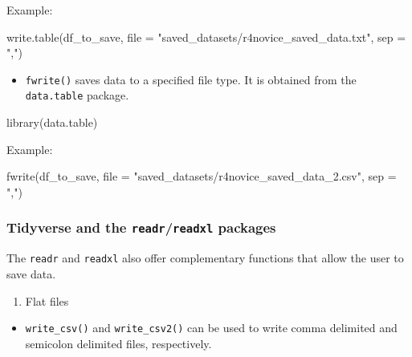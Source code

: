 \documentclass[
  letterpaper,
  DIV=11,
  numbers=noendperiod]{scrreprt}
\newenvironment{Shaded}{}{}
\newcommand{\AttributeTok}[1]{\textcolor[rgb]{0.84,0.23,0.29}{#1}}
\newcommand{\FunctionTok}[1]{\textcolor[rgb]{0.44,0.26,0.76}{#1}}
\newcommand{\NormalTok}[1]{\textcolor[rgb]{0.14,0.16,0.18}{#1}}
\newcommand{\StringTok}[1]{\textcolor[rgb]{0.01,0.18,0.38}{#1}}
\providecommand{\tightlist}{%
  \setlength{\itemsep}{0pt}\setlength{\parskip}{0pt}}\usepackage{longtable,booktabs,array}
\begin{document}
Example:

\begin{Shaded}
\begin{Highlighting}[]
\FunctionTok{write.table}\NormalTok{(df\_to\_save, }\AttributeTok{file =} \StringTok{"saved\_datasets/r4novice\_saved\_data.txt"}\NormalTok{, }\AttributeTok{sep =} \StringTok{","}\NormalTok{)}
\end{Highlighting}
\end{Shaded}

\begin{itemize}
\tightlist
\item
  \texttt{fwrite()} saves data to a specified file type. It is obtained
  from the \texttt{data.table} package.
\end{itemize}

\begin{Shaded}
\begin{Highlighting}[]
\FunctionTok{library}\NormalTok{(data.table)}
\end{Highlighting}
\end{Shaded}

Example:

\begin{Shaded}
\begin{Highlighting}[]
\FunctionTok{fwrite}\NormalTok{(df\_to\_save, }\AttributeTok{file =} \StringTok{"saved\_datasets/r4novice\_saved\_data\_2.csv"}\NormalTok{, }\AttributeTok{sep =} \StringTok{","}\NormalTok{)}
\end{Highlighting}
\end{Shaded}

\subsubsection{\texorpdfstring{Tidyverse and the
\texttt{readr}/\texttt{readxl}
packages}{Tidyverse and the readr/readxl packages}}\label{tidyverse-and-the-readrreadxl-packages-1}

The \texttt{readr} and \texttt{readxl} also offer complementary
functions that allow the user to save data.

\begin{enumerate}
\def\labelenumi{\alph{enumi}.}
\tightlist
\item
  Flat files
\end{enumerate}

\begin{itemize}
\tightlist
\item
  \texttt{write\_csv()} and \texttt{write\_csv2()} can be used to write
  comma delimited and semicolon delimited files, respectively.
\end{itemize}
\end{document}
